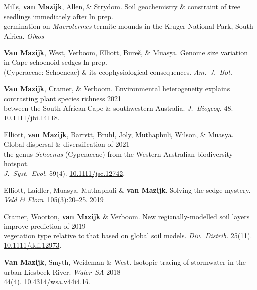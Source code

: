 
Mills, \textbf{van Mazijk}, Allen, \& Strydom.
Soil geochemistry \& constraint of tree seedlings immediately after
                                                              \hfill In prep. \\
\hspace{2em} germination on \textit{Macrotermes} termite
  mounds in the Kruger National Park, South Africa.
  \textit{Oikos}

\textbf{Van Mazijk}, West, Verboom, Elliott, Bureš, \& Muasya.
Genome size variation in Cape schoenoid sedges                \hfill In prep. \\
\hspace{2em} (Cyperaceae: Schoeneae) \& its ecophysiological consequences.
  \textit{Am.~J.~Bot.}

\textbf{Van Mazijk}, Cramer, \& Verboom.
Environmental heterogeneity explains contrasting plant species richness
                                                                  \hfill 2021 \\
\hspace{2em}
  between the South African Cape \& southwestern Australia.
  \textit{J.~Biogeog.}
  48. \href{https://doi.org/10.1111/jbi.14118}{10.1111/jbi.14118}.

Elliott, \textbf{van Mazijk}, Barrett, Bruhl,
Joly, Muthaphuli, Wilson, \& Muasya.
Global dispersal \& diversification of                            \hfill 2021 \\
\hspace{2em}
  the genus \textit{Schoenus} (Cyperaceae)
  from the Western Australian biodiversity hotspot.                           \\
\hspace{2em}
  \textit{J.~Syst.~Evol.}
  59(4).
  \href{https://doi.org/10.1111/jse.1274}{10.1111/jse.12742}.

Elliott, Laidler, Muasya, Muthaphuli \& \textbf{van Mazijk}.
Solving the sedge mystery.
\textit{Veld \& Flora}~105(3):20--25.                             \hfill 2019

Cramer, Wootton, \textbf{van Mazijk} \& Verboom.
New regionally-modelled soil layers improve prediction of         \hfill 2019 \\
\hspace{2em}
  vegetation type relative to that based on global soil models.
  \textit{Div.~Distrib.}
  25(11).                                                        
  \href{https://doi.org/10.1111/ddi.12973}{10.1111/ddi.12973}.

\textbf{Van Mazijk}, Smyth, Weideman \& West.
Isotopic tracing of stormwater in the urban Liesbeek River.
\textit{Water~SA}                                                 \hfill 2018 \\
\hspace{2em}
  44(4).
  \href{https://doi.org/10.4314/wsa.v44i4.16}{10.4314/wsa.v44i4.16}.
